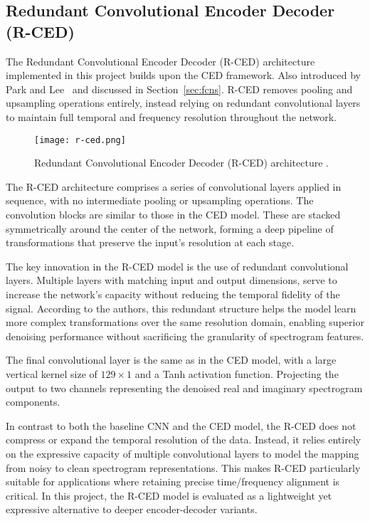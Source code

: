 \subsection{Redundant Convolutional Encoder Decoder (R-CED)}
\label{sec:rced}

The Redundant Convolutional Encoder Decoder (R-CED) architecture implemented in this project builds upon the CED framework. Also introduced by Park and Lee~\cite{park2017acoustic} and discussed in Section~\ref{sec:fcns}. R-CED removes pooling and upsampling operations entirely, instead relying on redundant convolutional layers to maintain full temporal and frequency resolution throughout the network.

\begin{figure}[h]
    \centering
    \texttt{[image: r-ced.png]}
    \caption{\label{fig:rced}Redundant Convolutional Encoder Decoder (R-CED) architecture \cite{park2017acoustic}.}
\end{figure}

The R-CED architecture comprises a series of convolutional layers applied in sequence, with no intermediate pooling or upsampling operations. The convolution blocks are similar to those in the CED model. These are stacked symmetrically around the center of the network, forming a deep pipeline of transformations that preserve the input’s resolution at each stage.

The key innovation in the R-CED model is the use of redundant convolutional layers. Multiple layers with matching input and output dimensions, serve to increase the network’s capacity without reducing the temporal fidelity of the signal. According to the authors, this redundant structure helps the model learn more complex transformations over the same resolution domain, enabling superior denoising performance without sacrificing the granularity of spectrogram features.

The final convolutional layer is the same as in the CED model, with a large vertical kernel size of \(129 \times 1\) and a Tanh activation function. Projecting the output to two channels representing the denoised real and imaginary spectrogram components.

In contrast to both the baseline CNN and the CED model, the R-CED does not compress or expand the temporal resolution of the data. Instead, it relies entirely on the expressive capacity of multiple convolutional layers to model the mapping from noisy to clean spectrogram representations. This makes R-CED particularly suitable for applications where retaining precise time/frequency alignment is critical. In this project, the R-CED model is evaluated as a lightweight yet expressive alternative to deeper encoder-decoder variants.

